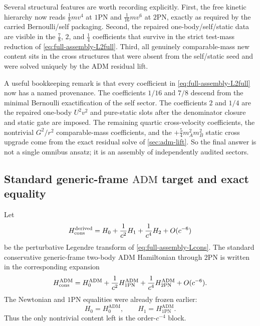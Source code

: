 \documentclass[11pt]{article}
\newcommand{\OnePN}{\mathrm{1PN}}
\newcommand{\TwoPN}{\mathrm{2PN}}
\newcommand{\ADM}{\mathrm{ADM}}
\begin{document}
Several structural features are worth recording explicitly.
First, the free kinetic hierarchy now reads
\(\frac18 m v^4\) at \(\OnePN\) and
\(\frac1{16}m v^6\) at \(\TwoPN\), exactly as required by the carried Bernoulli/self
packaging.  Second, the repaired one-body/self/static data are visible in the
\(\frac78\), \(2\), and \(\frac14\) coefficients that survive in the strict test-mass
reduction of \cref{eq:full-assembly-L2full}.  Third, all genuinely comparable-mass new
content sits in the cross structures that were absent from the self/static seed and were
solved uniquely by the \(\ADM\) residual lift.

A useful bookkeeping remark is that every coefficient in
\cref{eq:full-assembly-L2full} now has a named provenance.  The coefficients
\(1/16\) and \(7/8\) descend from the minimal Bernoulli exactification of the self
sector.  The coefficients \(2\) and \(1/4\) are the repaired one-body
\(U^2v^2\) and pure-static slots after the denominator closure and static gate are
imposed.  The remaining quartic cross-velocity coefficients, the nontrivial
\(G^2/r^2\) comparable-mass coefficients, and the \(+\frac54 m_A^2m_B^2\) static cross
upgrade come from the exact residual solve of \cref{sec:adm-lift}.  So the final answer
is not a single omnibus ansatz; it is an assembly of independently audited sectors.

\subsection{Standard generic-frame \texorpdfstring{$\ADM$}{ADM} target and exact equality}
\label{sec:full-assembly-adm}

Let
\begin{equation}
H_{\rm cons}^{\rm derived}
=
H_0+\frac{1}{c^2}H_1+\frac{1}{c^4}H_2+O(c^{-6})
\label{eq:full-assembly-Hderived}
\end{equation}
be the perturbative Legendre transform of
\cref{eq:full-assembly-Lcons}.  The standard conservative generic-frame two-body
\(\ADM\) Hamiltonian through \(\TwoPN\) is written in the corresponding expansion
\begin{equation}
H_{\rm cons}^{\ADM}
=
H_0^{\ADM}+\frac{1}{c^2}H_{1\mathrm{PN}}^{\ADM}
+\frac{1}{c^4}H_{2\mathrm{PN}}^{\ADM}+O(c^{-6}).
\label{eq:full-assembly-Hadm}
\end{equation}
The Newtonian and \(\OnePN\) equalities were already frozen earlier:
\begin{equation}
H_0=H_0^{\ADM},
\qquad
H_1=H_{1\mathrm{PN}}^{\ADM}.
\label{eq:full-assembly-H01-match}
\end{equation}
Thus the only nontrivial content left is the order-\(c^{-4}\) block.
\end{document}
